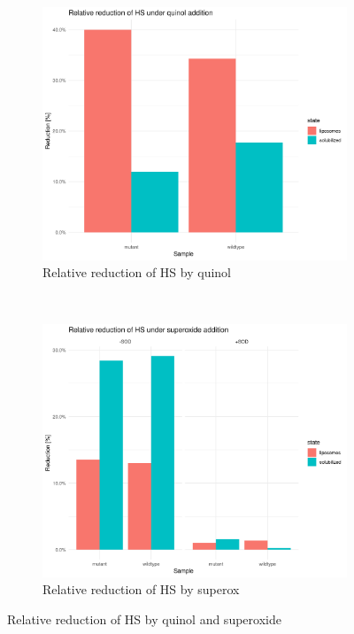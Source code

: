\begin{figure}
    \centering
    \begin{subfigure}{0.45\textwidth}
	\includegraphics[width=\textwidth]{img/reduction_quinol_relative.png}
	\caption{Relative reduction of HS by quinol}
	\label{fig:reduction_quinol_relative}
    \end{subfigure}
    ~
    \begin{subfigure}{0.45\textwidth}
	\centering
	\includegraphics[width=\textwidth]{img/reduction_superox_relative.png}
	\caption{Relative reduction of HS by superox}
	\label{fig:reduction_superox_relative}
    \end{subfigure}
    \caption{Relative reduction of HS by quinol and superoxide}
    \label{fig:relative_reduction}
\end{figure}

